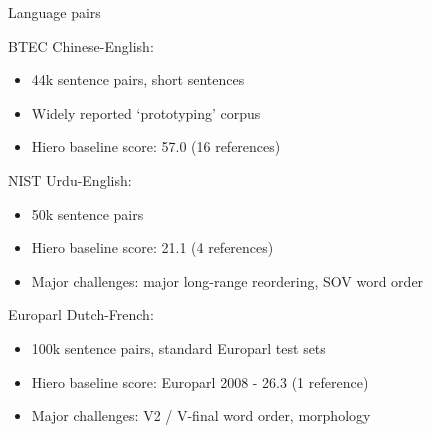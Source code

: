 \documentclass{beamer}
\newenvironment{unpacked_itemize}{
\begin{itemize}
  \setlength{\itemsep}{10pt}
  \setlength{\parskip}{0pt}
  \setlength{\parsep}{0pt}
}{\end{itemize}}
\begin{document}
\begin{frame}[t]{Language pairs}
\begin{unpacked_itemize}
\item BTEC Chinese-English:
  \begin{itemize}
  \item 44k sentence pairs, short sentences
  \item Widely reported `prototyping' corpus
  \item Hiero baseline score: 57.0 (16 references)
  \end{itemize}
\item NIST Urdu-English:
  \begin{itemize}
  \item 50k sentence pairs
  \item Hiero baseline score: 21.1 (4 references)
  \item Major challenges: major long-range reordering, SOV word order
  \end{itemize}
\item Europarl Dutch-French:
  \begin{itemize}
  \item 100k sentence pairs, standard Europarl test sets
  \item Hiero baseline score: Europarl 2008 - 26.3 (1 reference)
  \item Major challenges: V2 / V-final word order, morphology
  \end{itemize}
\end{unpacked_itemize}
\end{frame}
\end{document}
